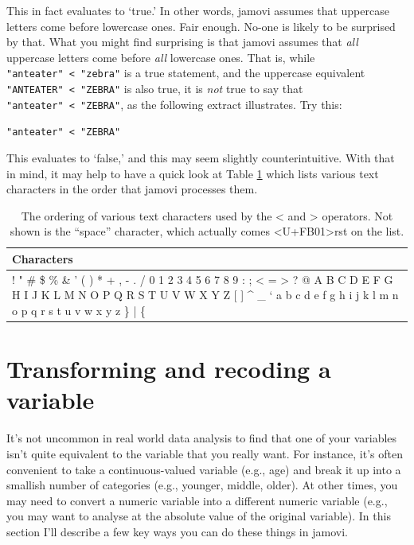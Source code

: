 \documentclass[
]{book}
\begin{document}
This in fact evaluates to `true.' In other words, jamovi assumes that uppercase letters come before lowercase ones. Fair enough. No-one is likely to be surprised by that. What you might find surprising is that jamovi assumes that \emph{all} uppercase letters come before \emph{all} lowercase ones. That is, while \texttt{"anteater"\ \textless{}\ "zebra"} is a true statement, and the uppercase equivalent \texttt{"ANTEATER"\ \textless{}\ "ZEBRA"} is also true, it is \emph{not} true to say that \texttt{"anteater"\ \textless{}\ "ZEBRA"}, as the following extract illustrates. Try this:

\texttt{"anteater"\ \textless{}\ "ZEBRA"}

This evaluates to `false,' and this may seem slightly counterintuitive. With that in mind, it may help to have a quick look at Table \ref{tab:asciiorder} which lists various text characters in the order that jamovi processes them.

\begin{table}

\caption{\label{tab:asciiorder}The ordering of various text characters used by the < and > operators. Not shown is the “space” character, which actually comes <U+FB01>rst on the list.}
\centering
\begin{tabular}[t]{l}
\hline
Characters\\
\hline
! " \# \$ \% \& ’ ( ) * + , - . / 0 1 2 3 4 5 6 7 8 9 : ; < = > ? @ A B C D E F G H I J K L M N O P Q R S T U V W X Y Z [  ] \textasciicircum{} \_ ‘ a b c d e f g h i j k l m n o p q r s t u v w x y z \} | \{\\
\hline
\end{tabular}
\end{table}

\hypertarget{transform}{%
\section{Transforming and recoding a variable}\label{transform}}

It's not uncommon in real world data analysis to find that one of your variables isn't quite equivalent to the variable that you really want. For instance, it's often convenient to take a continuous-valued variable (e.g., age) and break it up into a smallish number of categories (e.g., younger, middle, older). At other times, you may need to convert a numeric variable into a different numeric variable (e.g., you may want to analyse at the absolute value of the original variable). In this section I'll describe a few key ways you can do these things in jamovi.
\end{document}
